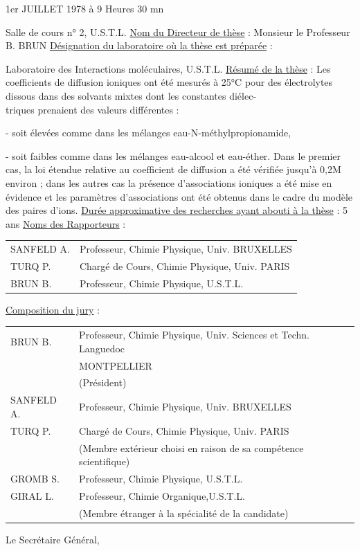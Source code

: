 1er JUILLET 1978 à 9 Heures 30 mn

Salle de cours n° 2, U.S.T.L.
\uline{Nom du Directeur de thèse} : Monsieur le Professeur B. BRUN
\uline{Désignation du laboratoire où la thèse est préparée} :

Laboratoire des Interactions moléculaires, U.S.T.L.
\uline{Résumé de la thèse} : Les coefficients de diffusion ioniques ont été mesurés à 25°C pour des électrolytes dissous dans des solvants mixtes dont les constantes diélec-\\
triques prenaient des valeurs différentes :

- soit élevées comme dans les mélanges eau-N-méthylpropionamide,

- soit faibles comme dans les mélanges eau-alcool et eau-éther.
Dans le premier cas, la loi étendue relative au coefficient de diffusion a été vérifiée jusqu'à 0,2M environ ; dans les autres cas la présence d'associations ioniques a été mise en évidence et les paramètres d'associations ont été obtenus dans le cadre du modèle des paires d'ions.
\uline{Durée approximative des recherches ayant abouti à la thèse} : 5 ans
\uline{Noms des Rapporteurs} :

\begin{tabular}{ll}
SANFELD A. & Professeur, Chimie Physique, Univ. BRUXELLES\\
TURQ P. & Chargé de Cours, Chimie Physique, Univ. PARIS\\
BRUN B. & Professeur, Chimie Physique, U.S.T.L.
\end{tabular}
\uline{Composition du jury} :

\begin{tabular}{lp{.74\linewidth}}
BRUN B. & Professeur, Chimie Physique, Univ. Sciences et Techn. Languedoc\\
& MONTPELLIER\\
& (Président)\\
SANFELD A. & Professeur, Chimie Physique, Univ. BRUXELLES\\
TURQ P. & Chargé de Cours, Chimie Physique, Univ. PARIS\\
& (Membre extérieur choisi en raison de sa compétence scientifique)\\
GROMB S. & Professeur, Chimie Physique, U.S.T.L.\\
GIRAL L. & Professeur, Chimie Organique,U.S.T.L.\\
& (Membre étranger à la spécialité de la candidate)
\end{tabular}
Le Secrétaire Général,

